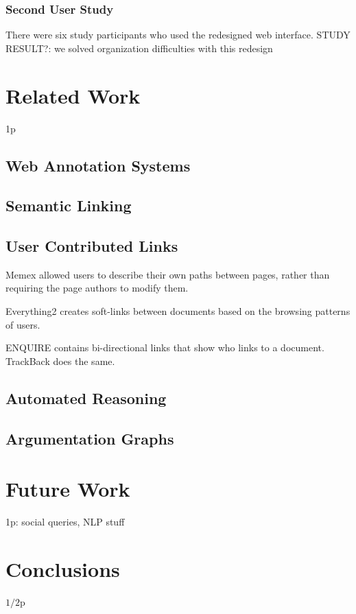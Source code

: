 \documentclass{sig-alt-release2}
\newcommand{\studyresult}[1]{{\color{red} STUDY RESULT?: #1}\\}
\begin{document}
\subsubsection{Second User Study}
\label{secondstudy}
There were six study participants who used the redesigned web interface.
\studyresult{we solved organization difficulties with this redesign}

\section{Related Work}
1p

\subsection{Web Annotation Systems}

\subsection{Semantic Linking}

\subsection{User Contributed Links}

Memex allowed users to describe their own paths between pages, rather than requiring the page authors to modify them.

Everything2 creates soft-links between documents based on the browsing patterns of users.

ENQUIRE contains bi-directional links that show who links to a document. TrackBack does the same.

\subsection{Automated Reasoning}

\subsection{Argumentation Graphs}


\section{Future Work}
1p: social queries, NLP stuff

\section{Conclusions}
$1/2$p
\end{document}

